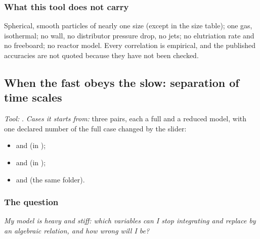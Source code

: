 \documentclass[11pt,a4paper]{article}
\begin{document}
\subsubsection*{What this tool does not carry}

Spherical, smooth particles of nearly one size (except in the size table); one
gas, isothermal; no wall, no distributor pressure drop, no jets; no elutriation
rate and no freeboard; no reactor model.  Every correlation is empirical, and
the published accuracies are not quoted because they have not been checked.

\subsection{When the fast obeys the slow: separation of time scales}\label{sec:edu-fast-and-slow}


\noindent\textit{\small Tool:} .  \textit{\small
Cases it starts from:} three pairs, each a full and a reduced model, with one
declared number of the full case changed by the slider:
\begin{itemize}[leftmargin=*,nosep,topsep=2pt]
  \item {} and
         (in );
  \item {} and
         (in );
  \item {} and
         (the same folder).
\end{itemize}

\subsubsection*{The question}

\emph{My model is heavy and stiff: which variables can I stop integrating and
replace by an algebraic relation, and how wrong will I be?}
\end{document}
